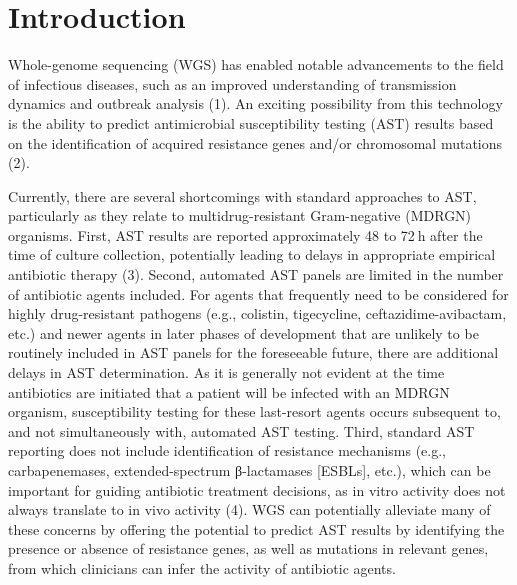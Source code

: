 \section{Introduction}
\label{sec:intro}

Whole-genome sequencing (WGS) has enabled notable advancements to the field of infectious diseases, such as an improved understanding of transmission dynamics and outbreak analysis (1). An exciting possibility from this technology is the ability to predict antimicrobial susceptibility testing (AST) results based on the identification of acquired resistance genes and/or chromosomal mutations (2).

Currently, there are several shortcomings with standard approaches to AST, particularly as they relate to multidrug-resistant Gram-negative (MDRGN) organisms. First, AST results are reported approximately 48 to 72 h after the time of culture collection, potentially leading to delays in appropriate empirical antibiotic therapy (3). Second, automated AST panels are limited in the number of antibiotic agents included. For agents that frequently need to be considered for highly drug-resistant pathogens (e.g., colistin, tigecycline, ceftazidime-avibactam, etc.) and newer agents in later phases of development that are unlikely to be routinely included in AST panels for the foreseeable future, there are additional delays in AST determination. As it is generally not evident at the time antibiotics are initiated that a patient will be infected with an MDRGN organism, susceptibility testing for these last-resort agents occurs subsequent to, and not simultaneously with, automated AST testing. Third, standard AST reporting does not include identification of resistance mechanisms (e.g., carbapenemases, extended-spectrum β-lactamases [ESBLs], etc.), which can be important for guiding antibiotic treatment decisions, as in vitro activity does not always translate to in vivo activity (4). WGS can potentially alleviate many of these concerns by offering the potential to predict AST results by identifying the presence or absence of resistance genes, as well as mutations in relevant genes, from which clinicians can infer the activity of antibiotic agents.

